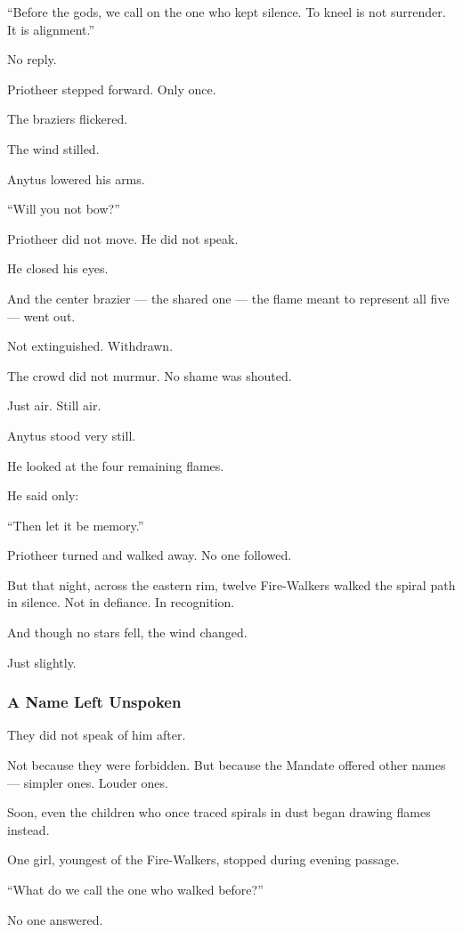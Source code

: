 \documentclass[12pt]{article}
\begin{document}
 “Before the gods, we call on the one who kept silence.  
 To kneel is not surrender.  
It is alignment.”

No reply.

Priotheer stepped forward.  
Only once.

The braziers flickered.

The wind stilled.

Anytus lowered his arms.

 “Will you not bow?”

Priotheer did not move.  
He did not speak.

He closed his eyes.

And the center brazier — the shared one —  
the flame meant to represent all five —  
went out.

Not extinguished.  
Withdrawn.

The crowd did not murmur.  
No shame was shouted.

Just air.  
Still air.

Anytus stood very still.

He looked at the four remaining flames.

He said only:

 “Then let it be memory.”

Priotheer turned and walked away.  
No one followed.

But that night, across the eastern rim,  
twelve Fire-Walkers walked the spiral path in silence.  
Not in defiance.  
In recognition.

And though no stars fell,  
the wind changed.

Just slightly.

\dotfill

\subsubsection{A Name Left Unspoken}

They did not speak of him after.

Not because they were forbidden.  
But because the Mandate offered other names —  
simpler ones.  
Louder ones.

Soon, even the children who once traced spirals in dust  
began drawing flames instead.

One girl, youngest of the Fire-Walkers,  
stopped during evening passage.

 “What do we call the one who walked before?”

No one answered.
\end{document}
